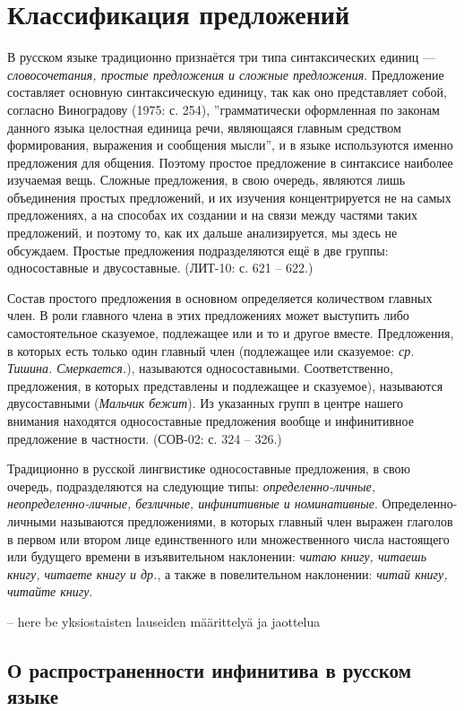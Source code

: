 \section{Классификация предложений}

В русском языке традиционно признаётся три типа синтаксических единиц --- \textit{словосочетания, простые предложения и сложные предложения}. Предложение составляет основную синтаксическую единицу, так как оно представляет собой, согласно Виноградову (1975: с. 254), ''грамматически оформленная по законам данного языка целостная единица речи, являющаяся главным средством формирования, выражения и сообщения мысли'', и в языке используются именно предложения для общения. Поэтому простое предложение в синтаксисе наиболее изучаемая вещь. Сложные предложения, в свою очередь, являются лишь объединения простых предложений, и их изучения концентрируется не на самых предложениях, а на способах их создании и на связи между частями таких предложений, и поэтому то, как их дальше анализируется, мы здесь не обсуждаем. Простые предложения подразделяются ещё в две группы: односоставные и двусоставные. (ЛИТ-10: с. 621 -- 622.) 

Состав простого предложения в основном определяется количеством главных член. В роли главного члена в этих предложениях может выступить либо самостоятельное сказуемое, подлежащее или и то и другое вместе. Предложения, в которых есть только один главный член (подлежащее или сказуемое: \textit{ср. Тишина. Смеркается.}), называются односоставными. Соответственно, предложения, в которых представлены и подлежащее и сказуемое), называются двусоставными (\textit{Мальчик бежит}). Из указанных групп в центре нашего внимания находятся односоставные предложения вообще и инфинитивное предложение в частности. (СОВ-02: с. 324 -- 326.)

Традиционно в русской лингвистике односоставные предложения, в свою очередь, подразделяются на следующие типы: \textit{определенно-личные, неопределенно-личные, безличные, инфинитивные и номинативные}. Определенно-личными называются предложениями, в которых главный член выражен глаголов в первом или втором лице единственного или множественного числа настоящего или будущего времени в изъявительном наклонении: \textit{читаю книгу, читаешь книгу, читаете книгу и др.}, а также в повелительном наклонении: \textit{читай книгу, читайте книгу}. 

-- here be yksiostaisten lauseiden määrittelyä ja jaottelua

\subsection{О распространенности инфинитива в русском языке}

